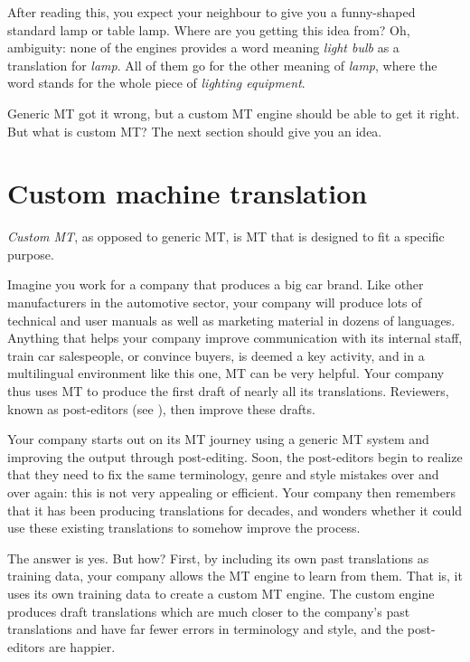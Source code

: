 \documentclass[output=paper]{langscibook}
\begin{document}
After reading this, you expect your neighbour to give you a funny-shaped standard lamp or table lamp. Where are you getting this idea from? Oh, ambiguity: none of the engines provides a word meaning \emph{light bulb} as a translation for \emph{lamp}. All of them go for the other meaning of \emph{lamp}, where the word stands for the whole piece of \emph{lighting equipment}. 

Generic MT got it wrong, but a custom MT engine should be able to get it right. But what is custom MT? The next section should give you an idea. 

\section{Custom machine translation}

\textit{Custom MT}, as opposed to generic MT, is MT that is designed to fit a specific purpose.

Imagine you work for a company that produces a big car brand. Like other manufacturers in the automotive sector, your company will produce lots of technical and user manuals as well as marketing material in dozens of languages. Anything that helps your company improve communication with its internal staff, train car salespeople, or convince buyers, is deemed a key activity, and in a multilingual environment like this one, MT can be very helpful. Your company thus uses MT to produce the first draft of nearly all its translations. Reviewers, known as post-editors (see ), then improve these drafts.

Your company starts out on its MT journey using a generic MT system and improving the output through post-editing. Soon, the post-editors begin to realize that they need to fix the same terminology, genre and style mistakes over and over again: this is not very appealing or efficient. Your company then remembers that it has been producing translations for decades, and wonders whether it could use these existing translations to somehow improve the process. 

The answer is yes. But how? First, by including its own past translations as training data, your company allows the MT engine to learn from them. That is, it uses its own training data to create a custom MT engine. The custom engine produces draft translations which are much closer to the company's past translations and have far fewer errors in terminology and style, and the post-editors are happier.
\end{document}
